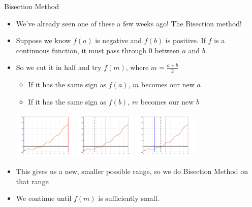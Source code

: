 {}\documentclass[letterpaper,
compress,
xcolor=x11names,
]{beamer}
\begin{document}

\begin{frame}{Bisection Method}
	\footnotesize
	\begin{itemize}
		\item We've already seen one of these a few weeks ago! The Bisection method!
		\item Suppose we know $f(a)$ is negative and $f(b)$ is positive. If $f$ is a continuous function, it must pass through 0 between $a$ and $b$.
		\item So we cut it in half and try $f(m)$, where $m  =\frac{a+b}{2}$
		\begin{itemize}
			\item If it has the same sign as $f(a)$, $m$ becomes our new $a$
			\item If it has the same sign as $f(b)$, $m$ becomes our new $b$
		\end{itemize} 
		\begin{center}
			\includegraphics[width = 3cm]{bisection_1.png} \hspace{0.25cm}
			\includegraphics[width = 3cm]{bisection_2.png} \hspace{0.25cm}
			\includegraphics[width = 3cm]{bisection_3.png}
		\end{center}
		\item This gives us a new, smaller possible range, so we do Bisection Method on that range
		\item We continue until $f(m)$ is sufficiently small.
	\end{itemize}
\end{frame}

\end{document}
